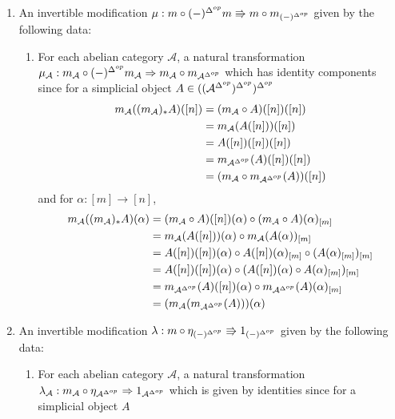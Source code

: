\begin{enumerate}
\begin{enumerate}
    \end{enumerate}
    \item An invertible modification $\mu:m\circ (-)^{\Delta^{op}} m\Rrightarrow m\circ m_{(-)^{\Delta^{op}}}$ given by the following data:
    \begin{enumerate}
        \item For each abelian category $\mathcal{A}$, a natural transformation $\mu_\mathcal{A}:m_\mathcal{A}\circ (-)^{\Delta^{op}} m_\mathcal{A}\Rightarrow m_\mathcal{A}\circ m_{\mathcal{A}^{\Delta^{op}}}$ which has identity components since for a simplicial object $A \in ((\mathcal{A}^{\Delta^{op}})^{\Delta^{op}})^{\Delta^{op}}$
        \begin{align*}
            m_\mathcal{A}((m_{\mathcal{A}})_*A)([n]) &= (m_\mathcal{A}\circ A)([n])([n]) \\
            &= m_\mathcal{A}(A([n]))([n]) \\
            &= A([n])([n])([n]) \\
            &= m_{\mathcal{A}^{\Delta^{op}}}(A)([n])([n]) \\
            &= (m_\mathcal{A}\circ m_{\mathcal{A}^{\Delta^{op}}}(A))([n]) 
        \end{align*}
        and for $\alpha:[m]\rightarrow [n]$,
        \begin{align*}
            m_\mathcal{A}((m_{\mathcal{A}})_*A)(\alpha) &= (m_\mathcal{A}\circ A)([n])(\alpha)\circ (m_\mathcal{A}\circ A)(\alpha)_{[m]} \\
            &= m_\mathcal{A}(A([n]))(\alpha)\circ m_\mathcal{A}(A(\alpha))_{[m]} \\
            &= A([n])([n])(\alpha)\circ A([n])(\alpha)_{[m]}\circ (A(\alpha)_{[m]})_{[m]} \\
            &= A([n])([n])(\alpha)\circ (A([n])(\alpha)\circ A(\alpha)_{[m]})_{[m]} \\
            &= m_{\mathcal{A}^{\Delta^{op}}}(A)([n])(\alpha)\circ m_{\mathcal{A}^{\Delta^{op}}}(A)(\alpha)_{[m]} \\
            &= (m_\mathcal{A}(m_{\mathcal{A}^{\Delta^{op}}}(A)))(\alpha)
        \end{align*}
    \end{enumerate}
    \item An invertible modification $\lambda:m\circ \eta_{(-)^{\Delta^{op}}} \Rrightarrow 1_{(-)^{\Delta^{op}}}$ given by the following data:
    \begin{enumerate}
        \item For each abelian category $\mathcal{A}$, a natural transformation $\lambda_\mathcal{A}:m_\mathcal{A}\circ \eta_{\mathcal{A}^{\Delta^{op}}}\Rightarrow 1_{\mathcal{A}^{\Delta^{op}}}$ which is given by identities since for a simplicial object $A$

\end{enumerate}
\end{enumerate}

